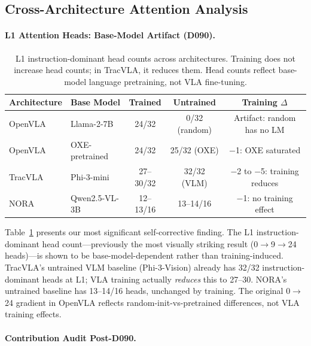 \documentclass[letterpaper]{article}
\begin{document}
\subsection{Cross-Architecture Attention Analysis}
\label{sec:attention}

\paragraph{L1 Attention Heads: Base-Model Artifact (D090).}

\begin{table}[h]
\centering
\caption{L1 instruction-dominant head counts across architectures. Training does not increase head counts; in TracVLA, it reduces them. Head counts reflect base-model language pretraining, not VLA fine-tuning.}
\label{tab:l1_heads}
\begin{tabular}{llccc}
\toprule
Architecture & Base Model & Trained & Untrained & Training $\Delta$ \\
\midrule
OpenVLA & Llama-2-7B & 24/32 & 0/32 (random) & Artifact: random has no LM \\
OpenVLA & OXE-pretrained & 24/32 & 25/32 (OXE) & $-$1: OXE saturated \\
TracVLA & Phi-3-mini & 27--30/32 & 32/32 (VLM) & $-$2 to $-$5: training reduces \\
NORA & Qwen2.5-VL-3B & 12--13/16 & 13--14/16 & $-$1: no training effect \\
\bottomrule
\end{tabular}
\end{table}

Table~\ref{tab:l1_heads} presents our most significant self-corrective finding. The L1 instruction-dominant head count---previously the most visually striking result (0$\to$9$\to$24 heads)---is shown to be base-model-dependent rather than training-induced. TracVLA's untrained VLM baseline (Phi-3-Vision) already has 32/32 instruction-dominant heads at L1; VLA training actually \emph{reduces} this to 27--30. NORA's untrained baseline has 13--14/16 heads, unchanged by training. The original 0$\to$24 gradient in OpenVLA reflects random-init-vs-pretrained differences, not VLA training effects.

\paragraph{Contribution Audit Post-D090.}
\end{document}
